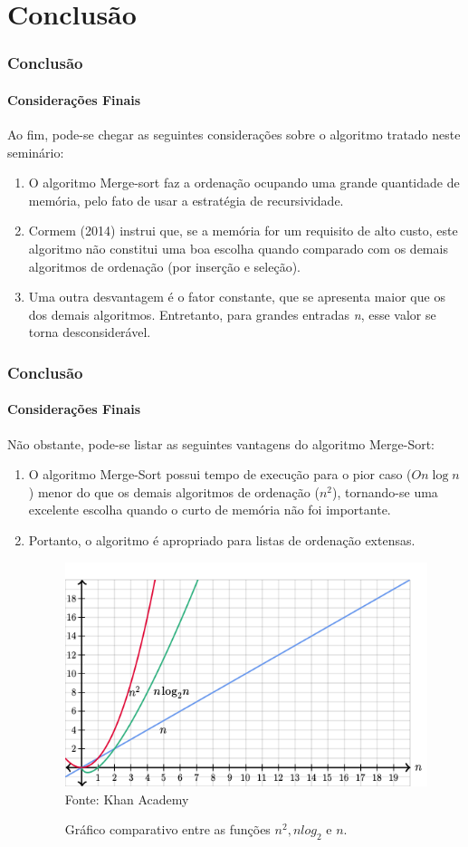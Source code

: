 \documentclass[aspectratio=169]{beamer}
\begin{document}
	\section{Conclusão}
	\begin{frame}
		\frametitle{Conclusão}
		\framesubtitle{Considerações Finais}
		Ao fim, pode-se chegar as seguintes considerações sobre o algoritmo tratado neste seminário:
		\begin{enumerate}
			\item O algoritmo Merge-sort faz a ordenação ocupando uma grande quantidade de memória, pelo fato de usar a estratégia de recursividade.
			\item Cormem (2014) instrui que, se a memória for um requisito de alto custo, este algoritmo não constitui uma boa escolha quando comparado com os demais algoritmos de ordenação (por inserção e seleção).
			\item Uma outra desvantagem é o fator constante, que se apresenta maior que os dos demais algoritmos. Entretanto, para grandes entradas \textit{n}, esse valor se torna desconsiderável.
		\end{enumerate}
	\end{frame}

\begin{frame}
	\frametitle{Conclusão}
	\framesubtitle{Considerações Finais}
	Não obstante, pode-se listar as seguintes vantagens do algoritmo Merge-Sort:
	\begin{enumerate}

		\item O algoritmo Merge-Sort possui tempo de execução para o pior caso ($ O  n\log n $) menor do que os demais algoritmos de ordenação ($ n^{2} $), tornando-se uma excelente escolha quando o curto de memória não foi importante.
		
		\item Portanto, o algoritmo é apropriado para listas de ordenação extensas.
		
		\begin{figure}
		\centering
		\caption{Gráfico comparativo entre as funções $ n^{2}, nlog_{2} $ e $n $.}
		\includegraphics[width=.35\linewidth]{graficocomparativo.png}\\
		\footnotesize{Fonte: Khan Academy}
		\label{graficocomparativo}
		\end{figure} 


	\end{enumerate}
\end{frame}
\end{document}
